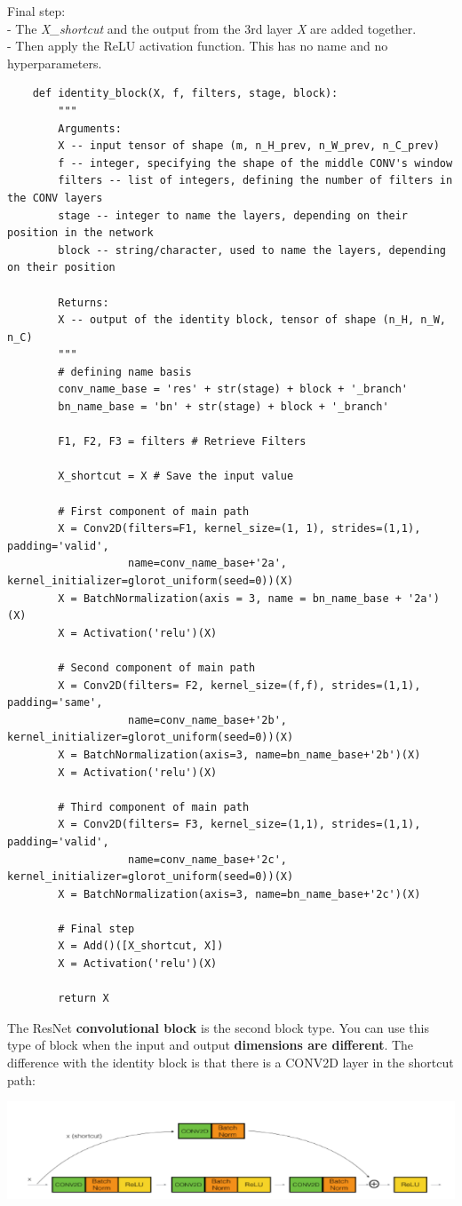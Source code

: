 \documentclass[11pt, a4paper]{article}
\begin{document}
\begin{spacing}{1.1}
	\noindent Final step: \\
	- The \textit{X\_shortcut} and the output from the 3rd layer \textit{X} are added together.\\
	- Then apply the ReLU activation function. This has no name and no hyperparameters.
	\begin{lstlisting}
	def identity_block(X, f, filters, stage, block):
		"""		
		Arguments:
		X -- input tensor of shape (m, n_H_prev, n_W_prev, n_C_prev)
		f -- integer, specifying the shape of the middle CONV's window 
		filters -- list of integers, defining the number of filters in the CONV layers
		stage -- integer to name the layers, depending on their position in the network
		block -- string/character, used to name the layers, depending on their position
		
		Returns:
		X -- output of the identity block, tensor of shape (n_H, n_W, n_C)
		"""
		# defining name basis
		conv_name_base = 'res' + str(stage) + block + '_branch'
		bn_name_base = 'bn' + str(stage) + block + '_branch'
		
		F1, F2, F3 = filters # Retrieve Filters
		
		X_shortcut = X # Save the input value
		
		# First component of main path
		X = Conv2D(filters=F1, kernel_size=(1, 1), strides=(1,1), padding='valid', 
		           name=conv_name_base+'2a', kernel_initializer=glorot_uniform(seed=0))(X)
		X = BatchNormalization(axis = 3, name = bn_name_base + '2a')(X)
		X = Activation('relu')(X)
		
		# Second component of main path
		X = Conv2D(filters= F2, kernel_size=(f,f), strides=(1,1), padding='same', 
		           name=conv_name_base+'2b', kernel_initializer=glorot_uniform(seed=0))(X)
		X = BatchNormalization(axis=3, name=bn_name_base+'2b')(X)
		X = Activation('relu')(X)
		
		# Third component of main path
		X = Conv2D(filters= F3, kernel_size=(1,1), strides=(1,1), padding='valid', 
		           name=conv_name_base+'2c', kernel_initializer=glorot_uniform(seed=0))(X)
		X = BatchNormalization(axis=3, name=bn_name_base+'2c')(X)
		
		# Final step
		X = Add()([X_shortcut, X])
		X = Activation('relu')(X)
		
		return X \end{lstlisting} \vspace*{1mm}
	The ResNet \textbf{convolutional block} is the second block type. You can use this type of block when the input and output \textbf{dimensions are different}. The difference with the identity block is that there is a CONV2D layer in the shortcut path: 
	\begin{center}	\includegraphics[scale=.9]{conv_block}	\end{center} \newpage


\end{spacing}
\end{document}
